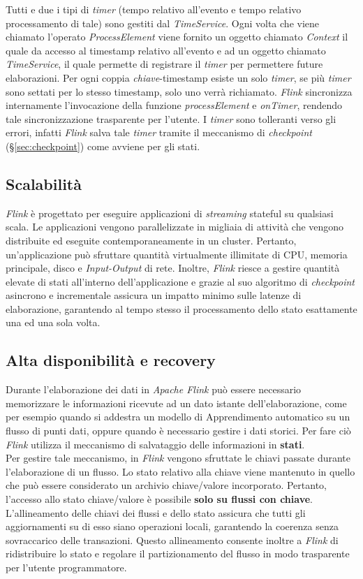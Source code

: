 \label{sec:timer}
Tutti e due i tipi di \textit{timer} (tempo relativo all'evento e tempo relativo processamento di tale) sono gestiti dal \textit{TimeService}. Ogni volta che viene chiamato l'operato \textit{ProcessElement} viene fornito un oggetto chiamato \textit{Context} il quale da accesso al \gls{timestamp} relativo all'evento e ad un oggetto chiamato \textit{TimeService}, il quale permette di registrare il \textit{timer} per permettere future elaborazioni. Per ogni coppia \textit{chiave}-\gls{timestamp} esiste un solo \textit{timer}, se più \textit{timer} sono settati per lo stesso \gls{timestamp}, solo uno verrà richiamato. \textit{Flink} sincronizza internamente l'invocazione della funzione \textit{processElement} e \textit{onTimer}, rendendo tale sincronizzazione trasparente per l'utente. I \textit{timer} sono tolleranti verso gli errori, infatti \textit{Flink} salva tale \textit{timer} tramite il meccanismo di \textit{checkpoint} (\S\ref{sec:checkpoint}) come avviene per gli stati.


\subsection{Scalabilità}
\textit{Flink} è progettato per eseguire applicazioni di \textit{streaming} \gls{stateful} su qualsiasi scala. Le applicazioni vengono parallelizzate in migliaia di attività che vengono distribuite ed eseguite contemporaneamente in un \gls{cluster}. Pertanto, un'applicazione può sfruttare quantità virtualmente illimitate di CPU, memoria principale, disco e \textit{Input-Output} di rete. Inoltre, \textit{Flink} riesce a gestire quantità elevate di stati all'interno dell'applicazione e grazie al suo algoritmo di \textit{checkpoint} asincrono e incrementale assicura un impatto minimo sulle latenze di elaborazione, garantendo al tempo stesso il processamento dello stato esattamente una ed una sola volta.

\subsection{Alta disponibilità e recovery}
Durante l'elaborazione dei dati in \textit{Apache Flink} può essere necessario memorizzare le informazioni ricevute ad un dato istante dell'elaborazione, come per esempio quando si addestra un modello di \gls{Apprendimento automatico} su un flusso di punti dati, oppure quando è necessario gestire i dati storici. Per fare ciò \textit{Flink} utilizza il meccanismo di salvataggio delle informazioni in \textbf{stati}.\\
Per gestire tale meccanismo, in \textit{Flink} vengono sfruttate le chiavi passate durante l'elaborazione di un flusso. Lo stato relativo alla chiave viene mantenuto in quello che può essere considerato un archivio chiave/valore incorporato. Pertanto, l'accesso allo stato chiave/valore è possibile \textbf{solo su flussi con chiave}. L'allineamento delle chiavi dei flussi e dello stato assicura che tutti gli aggiornamenti su di esso siano operazioni locali, garantendo la coerenza senza sovraccarico delle transazioni. Questo allineamento consente inoltre a \textit{Flink} di ridistribuire lo stato e regolare il partizionamento del flusso in modo trasparente per l'utente programmatore.

